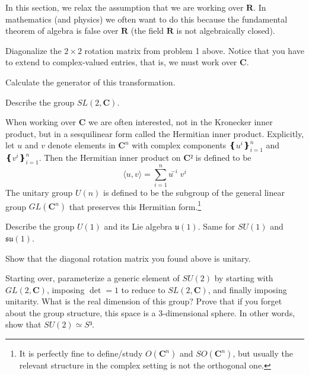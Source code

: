 In this section, we relax the assumption that we are working over $𝐑$. In mathematics (and physics) we often want to do this because the fundamental theorem of algebra is false over $𝐑$ (the field $𝐑$ is not algebraically closed).

\begin{exercise}
Diagonalize the $2 × 2$ rotation matrix from problem 1 above. Notice that you have to extend to complex-valued entries, that is, we must work over $𝐂$. 
\end{exercise}

\begin{exercise}
\label{L3}
Calculate the generator of this transformation. 
\end{exercise}

\begin{exercise}
Describe the group $SL(2, 𝐂)$. 
\end{exercise}

When working over $𝐂$ we are often interested, not in the Kronecker inner product, but in a sesquilinear form called the Hermitian inner product. Explicitly, let $u$ and $v$ denote elements in $𝐂^n$ with complex components $❴ u^i ❵_{i=1}^n$ and $❴v^i❵_{i=1}^n$. Then the Hermitian inner product on $𝐂²$ is defined to be
$$
\langle u, v \rangle = ∑_{i=1}^n ū^i v^i
$$
The unitary group $U(n)$ is defined to be the subgroup of the general linear group $GL(𝐂^n)$ that preserves this Hermitian form.\footnote{It is perfectly fine to define/study $O(𝐂^n)$ and $SO(𝐂^n)$, but usually the relevant structure in the complex setting is not the orthogonal one.}

\begin{exercise}
Describe the group $U(1)$ and its Lie algebra $𝔲(1)$. 
Same for $SU(1)$ and $𝔰𝔲(1)$.  
\end{exercise}

\begin{exercise}
Show that the diagonal rotation matrix you found above is unitary. 
\end{exercise}

\begin{exercise}
Starting over, parameterize a generic element of $SU(2)$ by starting with $GL(2, 𝐂)$, imposing $\det =1$ to reduce to $SL(2,𝐂)$, and finally imposing unitarity. 
What is the real dimension of this group? Prove that if you forget about the group structure, this space is a 3-dimensional sphere. In other words, show that $SU(2) ≃ S³$.
\end{exercise}

